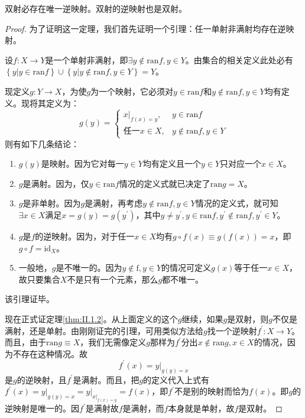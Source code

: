 \documentclass[../main.tex]{subfiles}
\begin{document}
\begin{theorem}\label{thm:II.1.2}
    双射必存在唯一逆映射。双射的逆映射也是双射。
\end{theorem}
\begin{proof}
    为了证明这一定理，我们首先证明一个引理：任一单射非满射均存在逆映射。

    设$f:X\rightarrow Y$是一个单射非满射，即$\exists y\notin\mathrm{ran}f,y\in Y$。由集合的相关定义此处必有$\left\{y|y\in\mathrm{ran}f\right\}\cup\left\{y|y\notin\mathrm{ran}f,y\in Y\right\}=Y$。

    现定义$g:Y\rightarrow X$，为使$g$为一个映射，它必须对$y\in\mathrm{ran}f$和$y\notin\mathrm{ran}f,y\in Y$均有定义。现将其定义为：
    \[
        g\left(y\right)=\left\{
        \begin{array}{ll}
            \left.x\right|_{f\left(x\right)=y}, & y\in\mathrm{ran}f           \\
            \text{任一}x\in X,                    & y\notin\mathrm{ran}f,y\in Y
        \end{array}
        \right.
    \]
    则有如下几条结论：
    \begin{enumerate}
        \item $g\left(y\right)$是映射。因为它对每一$y\in Y$均有定义且一个$y\in Y$只对应一个$x\in X$。
        \item $g$是满射。因为，仅$y\in\mathrm{ran}f$情况的定义式就已决定了$\mathrm{ran}g=X$。
        \item $g$是非单射。因为$g$是满射，再考虑$y\notin\mathrm{ran}f,y\in Y$情况的定义式，就可知$\exists x\in X$满足$x=g\left(y\right)=g\left(y^\prime\right)$，其中$y\neq y^\prime,y\in\mathrm{ran}f,y^\prime\notin\mathrm{ran}f,y^\prime\in Y$。
        \item $g$是$f$的逆映射。因为，对于任一$x\in X$均有$g\circ f\left(x\right)\equiv g\left(f\left(x\right)\right)=x$，即$g\circ f=\mathrm{id}_X$。
        \item 一般地，$g$是不唯一的。因为$y\notin\mathrm{f},y\in Y$的情况可定义$g\left(x\right)$等于任一$x\in X$，故只要集合$X$不是只有一个元素，那么$g$都不唯一。
    \end{enumerate}
    该引理证毕。

    现在正式证定理\ref{thm:II.1.2}。从上面定义的这个$g$继续，如果$g$是双射，则$g$不仅是满射，还是单射。由刚刚证完的引理，可用类似方法给$g$找一个逆映射$f^\prime:X\rightarrow Y$。而且，由于$\mathrm{ran}g\equiv X$，我们无需像定义$g$那样为$f^\prime$分出$x\notin\mathrm{ran}g,x\in X$的情况，因为不存在这种情况。故
    \[
        f^\prime\left(x\right)=\left.y\right|_{g\left(y\right)=x}
    \]
    是$g$的逆映射，且$f^\prime$是满射。而且，把$g$的定义代入上式有$f^\prime\left(x\right)=\left.y\right|_{g\left(y\right)=x}=\left.y\right|_{\left.x\right|_{f\left(x\right)=y}}=f\left(x\right)$，即$f^\prime$不是别的映射而恰为$f\left(x\right)$。即$g$的逆映射是唯一的。因$f^\prime$是满射故$f$是满射，而$f$本身就是单射，故$f$是双射。
\end{proof}
\end{document}

